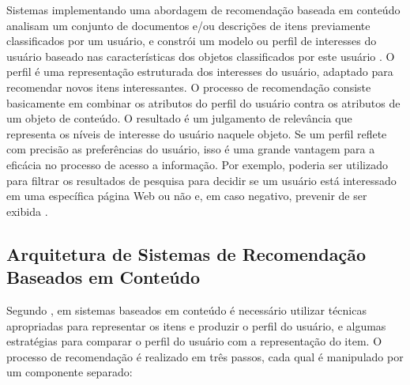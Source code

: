 Sistemas implementando uma abordagem de recomendação baseada em conteúdo analisam um conjunto de documentos e/ou descrições de itens previamente classificados por um usuário, e constrói um modelo ou perfil de interesses do usuário baseado nas características dos objetos classificados por este usuário \citep{Mladenic:1999:TRI:630307.630472}. O perfil é uma representação estruturada dos interesses do usuário, adaptado para recomendar novos itens interessantes. O processo de recomendação consiste basicamente em combinar os atributos do perfil do usuário contra os atributos de um objeto de conteúdo. O resultado é um julgamento de relevância que representa os níveis de interesse do usuário naquele objeto. Se um perfil reflete com precisão as preferências do usuário, isso é uma grande vantagem para a eficácia no processo de acesso a informação. Por exemplo, poderia ser utilizado para filtrar os resultados de pesquisa para decidir se um usuário está interessado em uma específica página Web ou não e, em caso negativo, prevenir de ser exibida \citep{lops2011ContentBased}.

\subsection{Arquitetura de Sistemas de Recomendação Baseados em Conteúdo}

Segundo \cite{lops2011ContentBased}, em sistemas baseados em conteúdo é necessário utilizar técnicas apropriadas para representar os itens e produzir o perfil do usuário, e algumas estratégias para comparar o perfil do usuário com a representação do item. O processo de recomendação é realizado em três passos, cada qual é manipulado por um componente separado:

